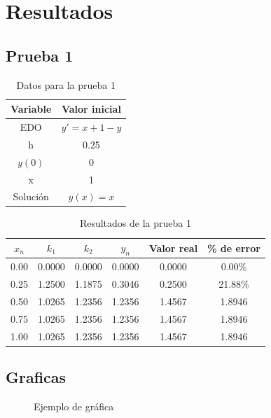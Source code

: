 \documentclass[article, 11pt]{IEEEtran}   %
\begin{document}
\section {Resultados}
\subsection{Prueba 1}
\begin{table}[H]
\centering
\caption{Datos para la prueba 1}
\label{DataTable1}
\begin{tabular}{|c|c|}
\hline
Variable & Valor inicial \\
\hline
EDO & $y\prime=x+1-y$\\
h & 0.25\\  
$y(0)$ & 0\\
x & 1\\
Solución & $y(x)=x$\\
\hline   
\end{tabular}
\end{table}

\begin{table}[H]
\centering
\caption{Resultados de la prueba 1}
\label{DataTable2}
\begin{tabular}{|c|c|c|c|c|c|}
\hline
$x_n$ & $k_1$ & $k_2$ & $y_n$ & Valor real & \% de error \\
\hline
0.00 & 0.0000 & 0.0000 & 0.0000 & 0.0000 & 0.00\%\\
0.25 & 1.2500 & 1.1875 & 0.3046 & 0.2500 & 21.88\%\\
0.50 & 1.0265 & 1.2356&1.2356 & 1.4567 & 1.8946\\
0.75 & 1.0265 & 1.2356&1.2356 & 1.4567 & 1.8946\\
1.00 & 1.0265 & 1.2356&1.2356 & 1.4567 & 1.8946\\
\hline   
\end{tabular}
\end{table}

\newpage

\subsection{Graficas}
\begin{figure}[H]
\centering
{}
\caption{Ejemplo de gr\'afica}\label{diagram1}   %
\end{figure}
\end{document}
